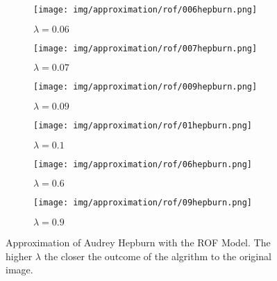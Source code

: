 \begin{figure}[ht]
    \centering
    \begin{subfigure}[b]{0.45\textwidth}
        \texttt{[image: img/approximation/rof/006hepburn.png]}
        \caption{$\lambda = 0.06$}
    \end{subfigure}
    \begin{subfigure}[b]{0.45\textwidth}
        \texttt{[image: img/approximation/rof/007hepburn.png]}
        \caption{$\lambda = 0.07$}
    \end{subfigure}
    \begin{subfigure}[b]{0.45\textwidth}
        \texttt{[image: img/approximation/rof/009hepburn.png]}
        \caption{$\lambda = 0.09$}
    \end{subfigure}
    \begin{subfigure}[b]{0.45\textwidth}
        \texttt{[image: img/approximation/rof/01hepburn.png]}
        \caption{$\lambda = 0.1$}
    \end{subfigure}
    \begin{subfigure}[b]{0.45\textwidth}
        \texttt{[image: img/approximation/rof/06hepburn.png]}
        \caption{$\lambda = 0.6$}
    \end{subfigure}
    \begin{subfigure}[b]{0.45\textwidth}
        \texttt{[image: img/approximation/rof/09hepburn.png]}
        \caption{$\lambda = 0.9$}
    \end{subfigure}
    \caption{Approximation of Audrey Hepburn with the ROF Model. The higher $\lambda$ the closer the outcome of the algrithm to the original image.}
\label{fig:rof_hepburn_compare}
\end{figure}


